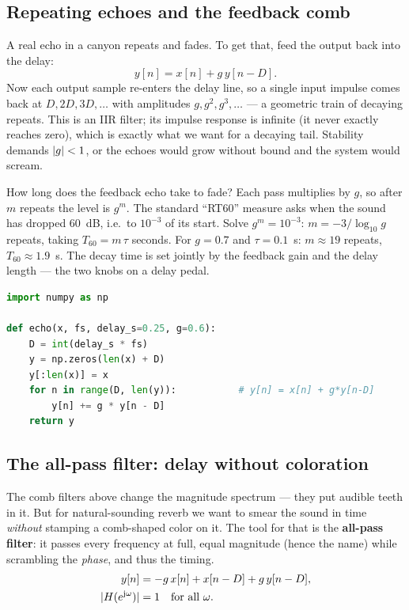 \subsection{Repeating echoes and the feedback comb}

A real echo in a canyon repeats and fades. To get that, feed the output back
into the delay:
\begin{equation}
\label{ch28:feedback-comb}
y[n]=x[n]+g\,y[n-D].
\end{equation}
Now each output sample re-enters the delay line, so a single input impulse comes
back at $D, 2D, 3D,\dots$ with amplitudes $g, g^2, g^3,\dots$ --- a geometric
train of decaying repeats. This is an IIR filter; its impulse response is
infinite (it never exactly reaches zero), which is exactly what we want for a
decaying tail. Stability demands $\lvert g\rvert<1$, or the echoes would grow without
bound and the system would scream.

\begin{walkbox}
How long does the feedback echo take to fade? Each pass multiplies by $g$, so
after $m$ repeats the level is $g^m$. The standard ``RT60'' measure asks when the
sound has dropped $60$~dB, i.e.\ to $10^{-3}$ of its start. Solve $g^m=10^{-3}$:
$m=-3/\log_{10}g$ repeats, taking $T_{60}=m\,\tau$ seconds. For $g=0.7$ and
$\tau=0.1$~s: $m\approx 19$ repeats, $T_{60}\approx 1.9$~s. The decay time is set
jointly by the feedback gain and the delay length --- the two knobs on a delay
pedal.
\end{walkbox}

\begin{lstlisting}[language=Python,caption={Feedback echo with a delay buffer.}]
import numpy as np

def echo(x, fs, delay_s=0.25, g=0.6):
    D = int(delay_s * fs)
    y = np.zeros(len(x) + D)
    y[:len(x)] = x
    for n in range(D, len(y)):           # y[n] = x[n] + g*y[n-D]
        y[n] += g * y[n - D]
    return y
\end{lstlisting}

\subsection{The all-pass filter: delay without coloration}

The comb filters above change the magnitude spectrum --- they put audible teeth
in it. But for natural-sounding reverb we want to smear the sound in time
\emph{without} stamping a comb-shaped color on it. The tool for that is the
\textbf{all-pass filter}: it passes every frequency at full, equal magnitude
(hence the name) while scrambling the \emph{phase}, and thus the timing.
\begin{align}
y[n] &=-g\,x[n]+x[n-D]+g\,y[n-D], \label{ch28:allpass}\\
\lvert H(e^{\mathrm{j}\omega})\rvert&=1 \quad \text{for all }\omega. \nonumber
\end{align}

